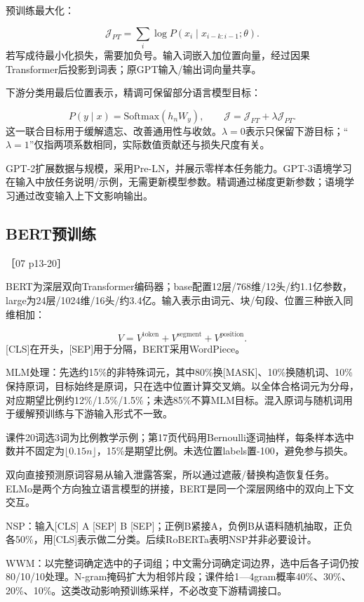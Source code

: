 \documentclass[UTF8,a4paper,zihao=-4,fontset=windows]{ctexart}
\newcommand{\source}[1]{{\small #1}\par}
\begin{document}
预训练最大化：

\[\mathcal J_{PT}=\sum_i\log P(x_i\mid x_{i-k:i-1};\theta).\]
若写成待最小化损失，需要加负号。输入词嵌入加位置向量，经过因果Transformer后投影到词表；原GPT输入/\allowbreak{}输出词向量共享。

下游分类用最后位置表示，精调可保留部分语言模型目标：

\[P(y\mid x)=\mathrm{Softmax}(h_nW_y),\qquad \mathcal J=\mathcal J_{FT}+\lambda\mathcal J_{PT}.\]
这一联合目标用于缓解遗忘、改善通用性与收敛。$\lambda=0$表示只保留下游目标；“$\lambda=1$”仅指两项系数相同，实际数值贡献还与损失尺度有关。

GPT-2扩展数据与规模，采用Pre-LN，并展示零样本任务能力。GPT-3语境学习在输入中放任务说明/\allowbreak{}示例，无需更新模型参数。精调通过梯度更新参数；语境学习通过改变输入上下文影响输出。

\subsection{BERT预训练}
\source{［07 p13-20］}
BERT为深层双向Transformer编码器；base配置12层/\allowbreak{}768维/\allowbreak{}12头/\allowbreak{}约1.1亿参数，large为24层/\allowbreak{}1024维/\allowbreak{}16头/\allowbreak{}约3.4亿。输入表示由词元、块/\allowbreak{}句段、位置三种嵌入同维相加：

\[V=V^{\mathrm{token}}+V^{\mathrm{segment}}+V^{\mathrm{position}}.\]
[CLS]在开头，[SEP]用于分隔，BERT采用WordPiece。

MLM处理：先选约15\%的非特殊词元，其中80\%换[MASK]、10\%换随机词、10\%保持原词，目标始终是原词，只在选中位置计算交叉熵。以全体合格词元为分母，对应期望比例约12\%/\allowbreak{}1.5\%/\allowbreak{}1.5\%；未选85\%不算MLM目标。混入原词与随机词用于缓解预训练与下游输入形式不一致。

课件20词选3词为比例教学示例；第17页代码用Bernoulli逐词抽样，每条样本选中数并不固定为$\lfloor0.15n\rfloor$，15\%是期望比例。未选位置labels置-100，避免参与损失。

双向直接预测原词容易从输入泄露答案，所以通过遮蔽/\allowbreak{}替换构造恢复任务。ELMo是两个方向独立语言模型的拼接，BERT是同一个深层网络中的双向上下文交互。

NSP：输入[CLS] A [SEP] B [SEP]；正例B紧接A，负例B从语料随机抽取，正负各50\%，用[CLS]表示做二分类。后续RoBERTa表明NSP并非必要设计。

WWM：以完整词确定选中的子词组；中文需分词确定词边界，选中后各子词仍按80/\allowbreak{}10/\allowbreak{}10处理。N-gram掩码扩大为相邻片段；课件给1---4gram概率40\%、30\%、20\%、10\%。这类改动影响预训练采样，不必改变下游精调接口。
\end{document}
